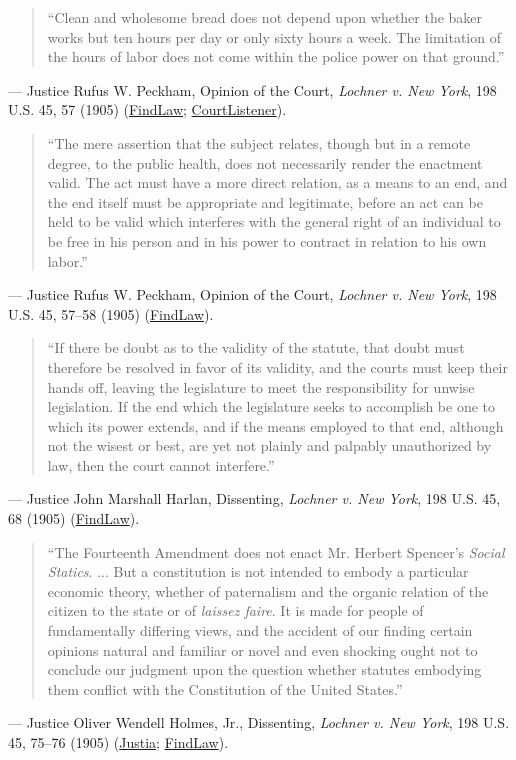 \documentclass[12pt]{article}
\begin{document}
\begin{quote}
``Clean and wholesome bread does not depend upon whether the baker works but ten hours per day or only sixty hours a week. The limitation of the hours of labor does not come within the police power on that ground.''
\end{quote}
\noindent --- Justice Rufus W. Peckham, Opinion of the Court, \textit{Lochner v. New York}, 198 U.S. 45, 57 (1905) (\href{https://caselaw.findlaw.com/court/us-supreme-court/198/45.html}{FindLaw}; \href{https://www.courtlistener.com/opinion/96276/lochner-v-new-york/}{CourtListener}).

\begin{quote}
``The mere assertion that the subject relates, though but in a remote degree, to the public health, does not necessarily render the enactment valid. The act must have a more direct relation, as a means to an end, and the end itself must be appropriate and legitimate, before an act can be held to be valid which interferes with the general right of an individual to be free in his person and in his power to contract in relation to his own labor.''
\end{quote}
\noindent --- Justice Rufus W. Peckham, Opinion of the Court, \textit{Lochner v. New York}, 198 U.S. 45, 57--58 (1905) (\href{https://caselaw.findlaw.com/court/us-supreme-court/198/45.html}{FindLaw}).

\begin{quote}
``If there be doubt as to the validity of the statute, that doubt must therefore be resolved in favor of its validity, and the courts must keep their hands off, leaving the legislature to meet the responsibility for unwise legislation. If the end which the legislature seeks to accomplish be one to which its power extends, and if the means employed to that end, although not the wisest or best, are yet not plainly and palpably unauthorized by law, then the court cannot interfere.''
\end{quote}
\noindent --- Justice John Marshall Harlan, Dissenting, \textit{Lochner v. New York}, 198 U.S. 45, 68 (1905) (\href{https://caselaw.findlaw.com/court/us-supreme-court/198/45.html}{FindLaw}).

\begin{quote}
``The Fourteenth Amendment does not enact Mr. Herbert Spencer's \textit{Social Statics}. ... But a constitution is not intended to embody a particular economic theory, whether of paternalism and the organic relation of the citizen to the state or of \textit{laissez faire}. It is made for people of fundamentally differing views, and the accident of our finding certain opinions natural and familiar or novel and even shocking ought not to conclude our judgment upon the question whether statutes embodying them conflict with the Constitution of the United States.''
\end{quote}
\noindent --- Justice Oliver Wendell Holmes, Jr., Dissenting, \textit{Lochner v. New York}, 198 U.S. 45, 75--76 (1905) (\href{https://supreme.justia.com/cases/federal/us/198/45/}{Justia}; \href{https://caselaw.findlaw.com/court/us-supreme-court/198/45.html}{FindLaw}).
\end{document}

